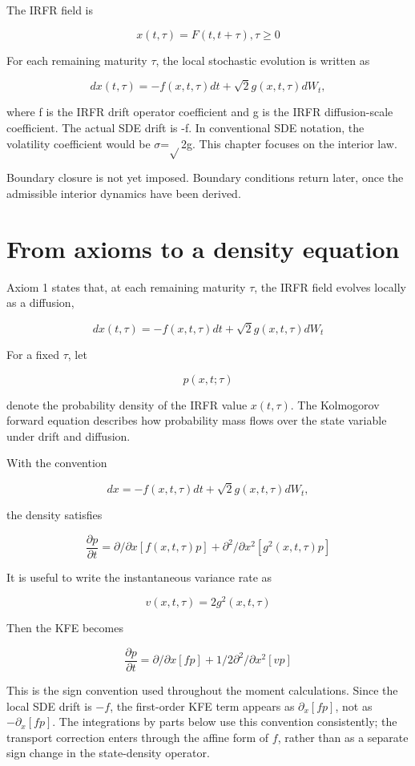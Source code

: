 \documentclass[11pt,oneside]{book}
\begin{document}
The IRFR field is

\[
x(t,\tau)=F(t,t+\tau), \tau\ge0
\]

For each remaining maturity $\tau$, the local stochastic evolution is written
as

\[
dx(t,\tau) = -f(x,t,\tau)dt + \sqrt{2} g(x,t,\tau)dW_t,
\]

where f is the IRFR drift operator coefficient and g is the IRFR
diffusion-scale coefficient. The actual SDE drift is -f. In conventional
SDE notation, the volatility coefficient would be $\sigma$=$\sqrt{}$2g. This chapter
focuses on the interior law.

Boundary closure is not yet imposed.
Boundary conditions return later, once the admissible interior dynamics
have been derived.

\section{From axioms to a density
equation}\label{from-axioms-to-a-density-equation}

Axiom 1 states that, at each remaining maturity $\tau$, the IRFR field
evolves locally as a diffusion,

\[
dx(t,\tau) = -f(x,t,\tau)dt + \sqrt{2} g(x,t,\tau)dW_t
\]

For a fixed $\tau$, let

\[
p(x,t;\tau)
\]

denote the probability density of the IRFR value $x(t,\tau)$. The Kolmogorov
forward equation describes how probability mass flows over the state
variable under drift and diffusion.

With the convention

\[
dx = -f(x,t,\tau)dt + \sqrt{2} g(x,t,\tau)dW_t,
\]

the density satisfies

\[
\frac{\partial p}{\partial t} = \partial/\partial x [ f(x,t,\tau)p ] + \partial^2/\partial x^2 [ g^2(x,t,\tau)p ]
\]

It is useful to write the instantaneous variance rate as

\[
v(x,t,\tau)=2g^2(x,t,\tau)
\]

Then the KFE becomes

\[
\frac{\partial p}{\partial t} = \partial/\partial x [ fp ] + 1/2 \partial^2/\partial x^2 [ vp ]
\]

This is the sign convention used throughout the moment calculations. Since the local SDE drift is \(-f\), the first-order KFE term appears as \(\partial_x[fp]\), not as \(-\partial_x[fp]\). The integrations by parts below use this convention consistently; the transport correction enters through the affine form of \(f\), rather than as a separate sign change in the state-density operator.
\end{document}
